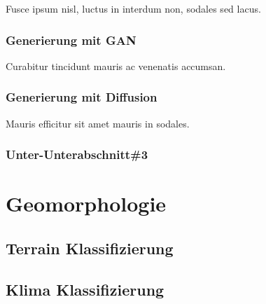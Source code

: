 Fusce ipsum nisl, luctus in interdum non, sodales sed lacus. 

\subsubsection{Generierung mit GAN}

Curabitur tincidunt mauris ac venenatis accumsan. 

\subsubsection{Generierung mit Diffusion}

Mauris efficitur sit amet mauris in sodales. 

\subsubsection{Unter-Unterabschnitt\#3}


\section{Geomorphologie}


\subsection{Terrain Klassifizierung}

\subsection{Klima Klassifizierung}

